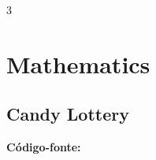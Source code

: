 \documentclass[8pt]{extarticle}
\begin{document}
\pagebreak
\begin{multicols*}{3}

\section{Mathematics}

\subsection{Candy Lottery}
\begin{caixaenunciado}

\end{caixaenunciado}
\vspace{0.3cm}
\noindent\textbf{Código-fonte:}

\end{multicols*}
\pagebreak
\end{document}
